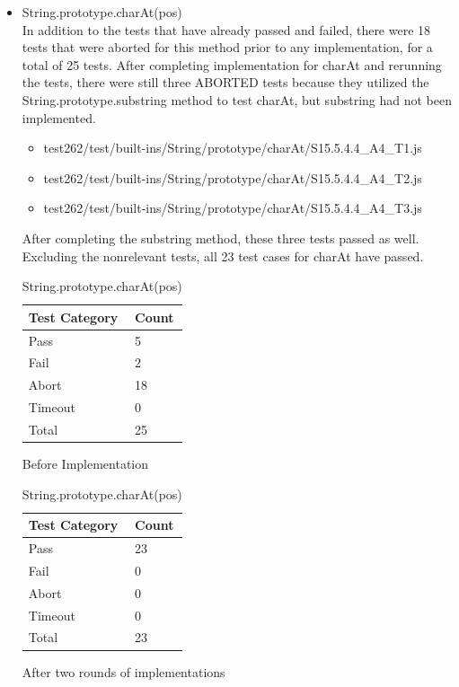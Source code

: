 \documentclass[a4paper,11pt,twoside]{report}
\begin{document}
\begin{itemize}
\item String.prototype.charAt(pos) \\
In addition to the tests that have already passed and failed, there were 18 tests that were aborted for this method prior to any implementation, for a total of 25 tests. After completing implementation for charAt and rerunning the tests, there were still three ABORTED tests because they utilized the String.prototype.substring method to test charAt, but substring had not been implemented.
\begin{itemize}
\item test262/test/built-ins/String/prototype/charAt/S15.5.4.4\_A4\_T1.js
\item test262/test/built-ins/String/prototype/charAt/S15.5.4.4\_A4\_T2.js
\item test262/test/built-ins/String/prototype/charAt/S15.5.4.4\_A4\_T3.js
\end{itemize}
After completing the substring method, these three tests passed as well. Excluding the nonrelevant tests, all 23 test cases for charAt have passed.
\begin{table}[ht!]
\centering
\begin{subtable}{0.5\textwidth}
\centering
\begin{tabular}{|p{3cm}|p{2cm}|} \hline
\textbf{Test Category} & \textbf{Count} \\ \hline
Pass & 5 \\
Fail & 2 \\
Abort & 18 \\
Timeout & 0 \\
Total & 25 \\ \hline
\end{tabular}
\caption{Before Implementation}
\end{subtable}%
\begin{subtable}{0.5\textwidth}
\centering
\begin{tabular}{|p{3cm}|p{2cm}|} \hline
\textbf{Test Category} & \textbf{Count} \\ \hline
Pass & 23 \\
Fail & 0 \\
Abort & 0 \\
Timeout & 0 \\
Total & 23 \\ \hline
\end{tabular}
\caption{After two rounds of implementations}
\end{subtable}
\caption{String.prototype.charAt(pos)}
\end{table}


\end{itemize}
\end{document}
